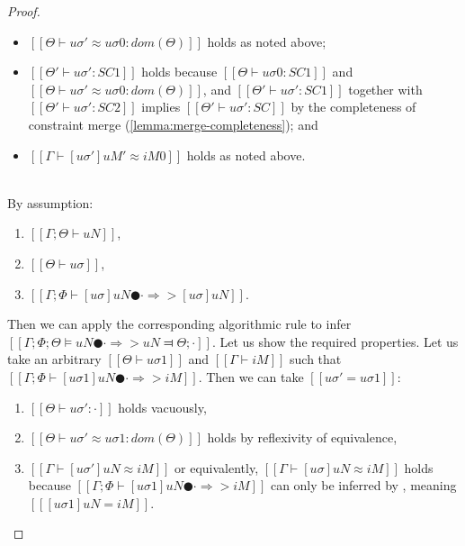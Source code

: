 \begin{proof}
\begin{caseof}
\begin{enumerate}
\begin{itemize}
                        \item $[[Θ ⊢ uσ' ≈ uσ0 : dom(Θ)]]$ holds as noted above;
                        \item $[[Θ' ⊢ uσ' : SC1]]$ holds because $[[Θ ⊢ uσ0 : SC1]]$ and 
                            $[[Θ ⊢ uσ' ≈ uσ0 : dom(Θ)]]$, 
                            and $[[Θ' ⊢ uσ' : SC1]]$ together with $[[Θ' ⊢ uσ' : SC2]]$  
                            implies $[[Θ' ⊢ uσ' : SC]]$ by the completeness of constraint merge 
                            (\cref{lemma:merge-completeness}); and
                        \item $[[Γ ⊢ [uσ']uM' ≈ iM0]]$ holds as noted above.
                    \end{itemize}
            \end{enumerate}

        \item {}\\
            By assumption: 
            \begin{enumerate}
                \item $[[Γ; Θ ⊢ uN]]$,
                \item $[[Θ ⊢ uσ]]$,
                \item $[[Γ; Φ ⊢ [uσ]uN ● · ⇒> [uσ]uN ]]$.
            \end{enumerate}
            Then we can apply the corresponding algorithmic rule
             to infer
            $[[ Γ; Φ; Θ ⊨ uN ● · ⇒> uN ⫤ Θ; · ]]$.
            Let us show the required properties. 
            Let us take an arbitrary 
            $[[Θ ⊢ uσ1]]$ and $[[Γ ⊢ iM]]$
            such that $[[Γ; Φ ⊢ [uσ1]uN ● · ⇒> iM]]$. 
            Then we can take $[[uσ' = uσ1]]$:
            \begin{enumerate}
                \item $[[Θ ⊢ uσ' : ·]]$ holds vacuously,
                \item $[[Θ ⊢ uσ' ≈ uσ1 : dom(Θ)]]$ holds by reflexivity of equivalence,
                \item $[[Γ ⊢ [uσ']uN ≈ iM]]$ or equivalently, 
                    $[[Γ ⊢ [uσ]uN ≈ iM]]$ holds because 
                    $[[Γ; Φ ⊢ [uσ1]uN ● · ⇒> iM]]$ can only be inferred by 
                    , meaning 
                        $[[ [uσ1]uN =  iM ]]$.
            \end{enumerate}
    \end{caseof}
\end{proof}
